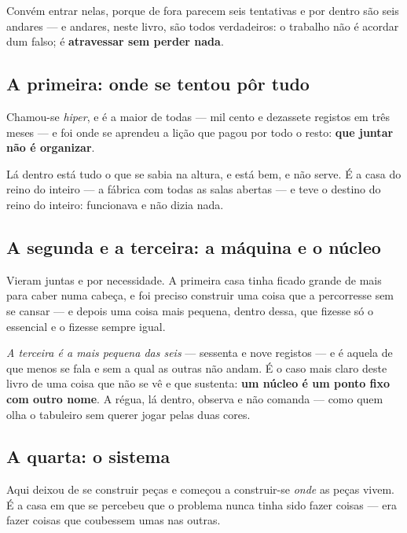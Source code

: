 \documentclass[livro.tex]{subfiles}
\begin{document}
Convém entrar nelas, porque de fora parecem seis tentativas e por dentro são seis andares ---
e andares, neste livro, são todos verdadeiros: o trabalho não é acordar dum falso; é
\textbf{atravessar sem perder nada}.

\subsection*{A primeira: onde se tentou pôr tudo}

Chamou-se \emph{hiper}, e é a maior de todas --- mil cento e dezassete registos em três meses --- e
foi onde se aprendeu a lição que pagou por todo o resto: \textbf{que juntar não é organizar}.

\medskip

Lá dentro está tudo o que se sabia na altura, e está bem, e não serve. É a casa do reino do
inteiro --- a fábrica com todas as salas abertas --- e teve o destino do reino do inteiro:
funcionava e não dizia nada.

\subsection*{A segunda e a terceira: a máquina e o núcleo}

Vieram juntas e por necessidade. A primeira casa tinha ficado grande de mais para caber numa
cabeça, e foi preciso construir uma coisa que a percorresse sem se cansar --- e depois uma coisa
mais pequena, dentro dessa, que fizesse só o essencial e o fizesse sempre igual.

\medskip

\emph{A terceira é a mais pequena das seis} --- sessenta e nove registos --- e é aquela de que
menos se fala e sem a qual as outras não andam. É o caso mais claro deste livro de uma coisa que
não se vê e que sustenta: \textbf{um núcleo é um ponto fixo com outro nome}. A régua, lá dentro,
observa e não comanda --- como quem olha o tabuleiro sem querer jogar pelas duas cores.

\subsection*{A quarta: o sistema}

Aqui deixou de se construir peças e começou a construir-se \emph{onde} as peças vivem. É a casa em
que se percebeu que o problema nunca tinha sido fazer coisas --- era fazer coisas que coubessem
umas nas outras.

\medskip
\end{document}
